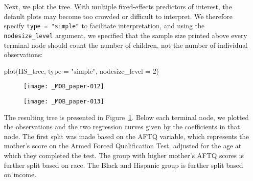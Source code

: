 \documentclass[doc,floatsintext,natbib]{apa7}
\begin{document}
Next, we plot the tree. With multiple fixed-effects predictors of interest, the default plots may become too crowded or difficult to interpret. We therefore specify \verb|type = "simple"| to facilitate interpretation, and using the \verb|nodesize_level| argument, we specified that the sample size printed above every terminal node should count the number of children, not the number of individual observations:

\begin{Schunk}
\begin{Sinput}
 plot(HS_tree, type = "simple", nodesize_level = 2)
\end{Sinput}
\end{Schunk}

\begin{figure}%
\caption{}
\texttt{[image: \_MOB\_paper-012]}

\vspace*{-3cm}

\texttt{[image: \_MOB\_paper-013]}
\label{fig:lmm_tree}
\end{figure}%

The resulting tree is presented in Figure~\ref{fig:lmm_tree}. Below each terminal node, we plotted the observations and the two regression curves given by the coefficients in that node. The first split was made based on the AFTQ variable, which represents the mother's score on the Armed Forced Qualification Test, adjusted for the age at which they completed the test. The group with higher mother's AFTQ scores is further split based on race. The Black and Hispanic group is further split based on income. 
\end{document}
